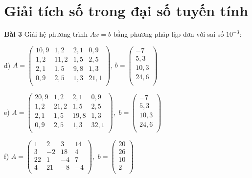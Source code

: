 \chapter{Giải tích số trong đại số tuyến tính}

\textbf{Bài 3} Giải hệ phương trình $Ax=b $ bằng phương pháp lặp đơn với sai số $10^{-3}$:\par

d) $A=\begin{pmatrix}
10,9&1,2&2,1&0,9\\
1,2&11,2&1,5&2,5\\
2,1&1,5&9,8&1,3\\
0,9&2,5&1,3&21,1\\
\end{pmatrix}$, $b= \begin{pmatrix}
-7\\
5,3\\
10,3\\
24,6\\
\end{pmatrix}$\par

e) $A=\begin{pmatrix}
20,9&1,2&2,1&0,9\\
1,2&21,2&1,5&2,5\\
2,1&1,5&19,8&1,3\\
0,9&2,5&1,3&32,1\\
\end{pmatrix}$,~$b= \begin{pmatrix}
-7\\
5,3\\
10,3\\
24,6\\
\end{pmatrix}$\par

f) $A= \begin{pmatrix}
1&2&3&14\\
3&-2&18&4\\
22&1&-4&7\\
4&21&-8&-4\\
\end{pmatrix}$,~$b= \begin{pmatrix}
20\\
26\\
10\\
2\\
\end{pmatrix}$\par

